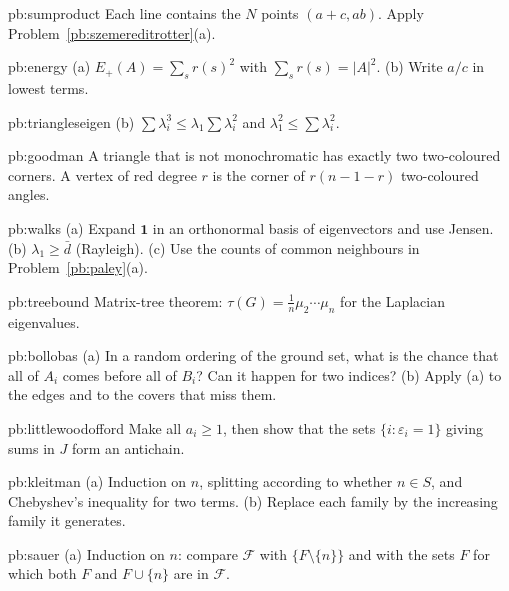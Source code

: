 \begin{hint}{pb:sumproduct}
Each line contains the $N$ points $(a+c,ab)$. Apply Problem~\ref{pb:szemereditrotter}(a).
\end{hint}

\begin{hint}{pb:energy}
(a) $E_+(A)=\sum_sr(s)^2$ with $\sum_sr(s)=|A|^2$. (b) Write $a/c$ in lowest terms.
\end{hint}

\begin{hint}{pb:triangleseigen}
(b) $\sum\lambda_i^3\le\lambda_1\sum\lambda_i^2$ and $\lambda_1^2\le\sum\lambda_i^2$.
\end{hint}

\begin{hint}{pb:goodman}
A triangle that is not monochromatic has exactly two two-coloured corners. A vertex of red degree $r$ is the corner of
$r(n-1-r)$ two-coloured angles.
\end{hint}

\begin{hint}{pb:walks}
(a) Expand $\mathbf1$ in an orthonormal basis of eigenvectors and use Jensen. (b) $\lambda_1\ge\bar d$ (Rayleigh). (c) Use the counts of
common neighbours in Problem~\ref{pb:paley}(a).
\end{hint}

\begin{hint}{pb:treebound}
Matrix-tree theorem: $\tau(G)=\frac1n\mu_2\cdots\mu_n$ for the Laplacian eigenvalues.
\end{hint}

\begin{hint}{pb:bollobas}
(a) In a random ordering of the ground set, what is the chance that all of $A_i$ comes before all of $B_i$? Can it happen for two
indices? (b) Apply (a) to the edges and to the covers that miss them.
\end{hint}

\begin{hint}{pb:littlewoodofford}
Make all $a_i\ge1$, then show that the sets $\{i:\varepsilon_i=1\}$ giving sums in $J$ form an antichain.
\end{hint}

\begin{hint}{pb:kleitman}
(a) Induction on $n$, splitting according to whether $n\in S$, and Chebyshev's inequality for two terms. (b) Replace each family by
the increasing family it generates.
\end{hint}

\begin{hint}{pb:sauer}
(a) Induction on $n$: compare $\mathcal F$ with $\{F\setminus\{n\}\}$ and with the sets $F$ for which both $F$ and $F\cup\{n\}$ are in $\mathcal F$.
\end{hint}

